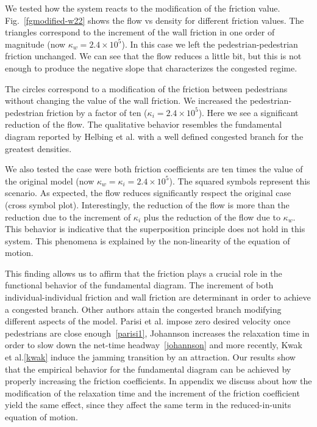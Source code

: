 We tested how the system reacts to the modification of the friction value. Fig.~\ref{fgmodified-w22} shows the flow vs density for different friction values. The triangles correspond to the increment of the wall friction in one order of magnitude (now $\kappa_w = 2.4\times10^{5}$). In this case we left the pedestrian-pedestrian friction unchanged. We can see that the flow reduces a little bit, but this is not enough to produce the negative slope that characterizes the congested regime. 

The circles correspond to a modification of the friction between pedestrians without changing the value of the wall friction. We increased the pedestrian-pedestrian friction by a factor of ten ($\kappa_i = 2.4\times10^{5}$). Here we see a significant reduction of the flow. The qualitative behavior resembles the fundamental diagram reported by Helbing et al. with a well defined congested branch for the greatest densities.

We also tested the case were both friction coefficients are ten times the value of the original model (now $\kappa_w = \kappa_i = 2.4\times10^{5}$). The squared symbols represent this scenario. As expected, the flow reduces significantly respect the original case (cross symbol plot). Interestingly, the reduction of the flow is more than the reduction due to the increment of $\kappa_i$ plus the reduction of the flow due to $\kappa_w$. This behavior is indicative that the superposition principle does not hold in this system. This phenomena is explained by the non-linearity of the equation of motion.   

This finding allows us to affirm that the friction plays a crucial role in the functional behavior of the fundamental diagram. The increment of both individual-individual friction and wall friction are determinant in order to achieve a congested branch. Other authors attain the congested branch modifying different aspects of the model. Parisi et al. impose zero desired velocity once pedestrians are close enough~\ref{parisi1}, Johannson increases the relaxation time in order to slow down the net-time headway~\ref{johannson} and more recently, Kwak et al.\ref{kwak} induce the jamming transition by an attraction. Our results show that the empirical behavior for the fundamental diagram can be achieved by properly increasing the friction coefficients. In appendix we discuss about how the modification of the relaxation time and the increment of the friction coefficient yield the same effect, since they affect the same term in the reduced-in-units equation of motion.  

